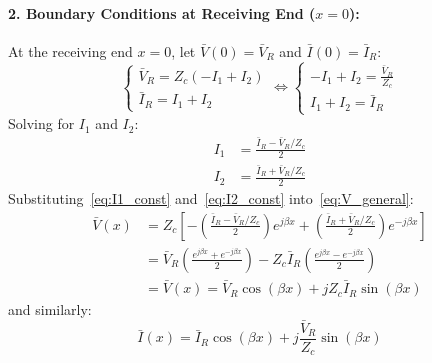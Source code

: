\paragraph{2. Boundary Conditions at Receiving End ($x = 0$):}
At the receiving end $x = 0$, let $\bar{V}(0) = \bar{V}_R$ and $\bar{I}(0) = \bar{I}_R$:
\begin{equation}
\begin{cases}
    \bar{V}_R = Z_c (-I_1 + I_2) \\
    \bar{I}_R = I_1 + I_2
\end{cases}
\iff
\begin{cases}
    -I_1 + I_2 = \frac{\bar{V}_R}{Z_c} \\
    I_1 + I_2 = \bar{I}_R
\end{cases}
\end{equation}
Solving for $I_1$ and $I_2$:
\begin{align}
    I_1 &= \frac{\bar{I}_R - \bar{V}_R/Z_c}{2} \label{eq:I1_const}\\
    I_2 &= \frac{\bar{I}_R + \bar{V}_R/Z_c}{2} \label{eq:I2_const}
\end{align}
Substituting~\eqref{eq:I1_const} and~\eqref{eq:I2_const} into~\eqref{eq:V_general}:
\begin{align}
    \bar{V}(x) &= Z_c \left[ -\left(\frac{\bar{I}_R - \bar{V}_R/Z_c}{2}\right) e^{j\beta x} + \left(\frac{\bar{I}_R + \bar{V}_R/Z_c}{2}\right) e^{-j\beta x} \right] \nonumber\\
               &= \bar{V}_R \left( \frac{e^{j\beta x} + e^{-j\beta x}}{2} \right) - Z_c \bar{I}_R \left( \frac{e^{j\beta x} - e^{-j\beta x}}{2} \right) \nonumber\\
               &= \boxed{\bar{V}(x) = \bar{V}_R \cos(\beta x) + j Z_c \bar{I}_R \sin(\beta x)} \label{eq:voltage_profile_final}
\end{align}
and similarly:
\begin{equation}
    \boxed{\bar{I}(x) = \bar{I}_R \cos(\beta x) + j \frac{\bar{V}_R}{Z_c} \sin(\beta x)}
\end{equation}

